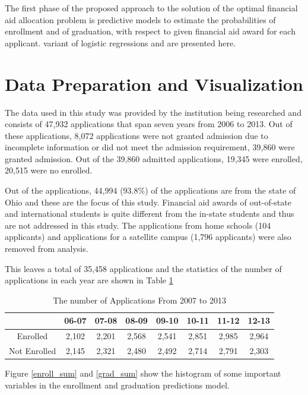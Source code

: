 \documentclass[12pt,english]{report}
\begin{document}
The first phase of the proposed approach to the solution of the optimal
financial aid allocation problem is predictive models to estimate the
probabilities of enrollment and of graduation, with respect to given financial
aid award for each applicant. %
variant of logistic regressions and are presented here.

\section{Data Preparation and Visualization}
The data used in this study was provided by the institution being researched
and consists of 47,932 applications that span seven years from 2006 to 2013.
Out of these applications, 8,072 applications were not granted admission due to
incomplete information or did not meet the admission requirement, 39,860 were
granted admission. Out of the 39,860 admitted applications, 19,345 were
enrolled, 20,515 were no enrolled.

Out of the applications, 44,994 (93.8\%) of the applications are from the state
of Ohio and these are the focus of this study. Financial aid awards of
out-of-state and international students is quite different from the in-state
students and thus are not addressed in this study. The applications from home
schools (104 applicants) and applications for a satellite campus (1,796
applicants) were also removed from analysis.

This leaves a total of 35,458 applications and the statistics of the number of
applications in each year are shown in Table \ref{enroll_year_sum}
\begin{table}[ht]
\centering
\begin{tabular}{|c|c|c|c|c|c|c|c|}
\hline
          & 06-07 & 07-08 & 08-09 & 09-10 & 10-11 & 11-12 & 12-13 \\ \hline
Enrolled  & 2,102  & 2,201  & 2,568  & 2,541  & 2,851  & 2,985  & 2,964  \\
\hline
Not Enrolled   & 2,145  & 2,321  & 2,480  & 2,492  & 2,714  & 2,791  & 2,303
\\ \hline
\end{tabular}
\caption{The number of Applications From 2007 to 2013}
\label{enroll_year_sum}
\end{table}




Figure \ref{enroll_sum} and \ref{grad_sum} show the histogram of some important variables in the enrollment and graduation predictions model.
\end{document}
